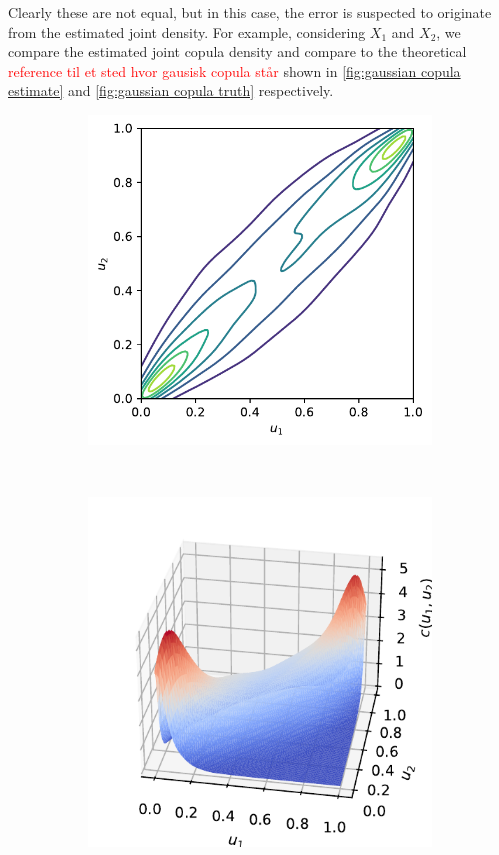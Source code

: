 \documentclass[../Thesis.tex]{subfiles}
\begin{document}
Clearly these are not equal, but in this case, the error is suspected to originate from the estimated joint density. For example, considering $X_1$ and $X_2$, we compare the estimated joint copula density and compare to the theoretical \textcolor{red}{reference til et sted hvor gausisk copula står} shown in \autoref{fig:gaussian copula estimate} and \autoref{fig:gaussian copula truth} respectively.
\begin{figure}[H]
    \centering
    \begin{subfigure}[t]{0.45\linewidth}
        \centering
        \includegraphics[width = \linewidth]{figures/ND examples/Gaussian copula sample contour.pdf}
        \caption{}
    \end{subfigure}%
    ~
    \begin{subfigure}[t]{0.5\linewidth}
        \includegraphics[width = \linewidth]{figures/ND examples/Gaussian copula sample pdf.pdf}

\end{subfigure}
\end{figure}
\end{document}
